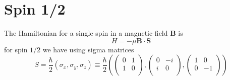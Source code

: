 \chapter{Spin 1/2}
The Hamiltonian for a single spin in a magnetic field $\mathbf B$ is
\begin{equation}
    H=-\mu\mathbf B \cdot \mathbf S
\end{equation} 
for spin $1/2$ we have using sigma matrices
\begin{equation}
    S=\frac{\hbar}{2}\left(\sigma_x,\sigma_y,\sigma_z\right) \equiv \frac{\hbar}{2}\left(\left(
\begin{array}{cc}
 0 & 1 \\
 1 & 0 \\
\end{array}
\right),\left(
\begin{array}{cc}
 0 & -i \\
 i & 0 \\
\end{array}
\right),\left(
\begin{array}{cc}
 1 & 0 \\
 0 & -1 \\
\end{array}
\right)\right)
\end{equation}

